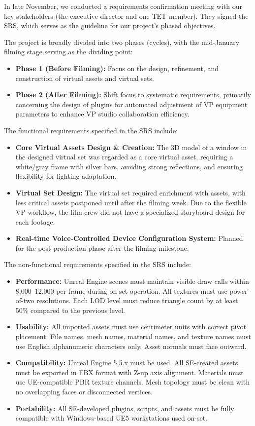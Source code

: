 \documentclass[12pt,a4paper]{report}
\begin{document}
In late November, we conducted a requirements confirmation meeting with our key stakeholders (the executive director and one TET member). They signed the SRS, which serves as the guideline for our project's phased objectives.

The project is broadly divided into two phases (cycles), with the mid-January filming stage serving as the dividing point:
\begin{itemize}
    \item \textbf{Phase 1 (Before Filming):} Focus on the design, refinement, and construction of virtual assets and virtual sets.
    \item \textbf{Phase 2 (After Filming):} Shift focus to systematic requirements, primarily concerning the design of plugins for automated adjustment of VP equipment parameters to enhance VP studio collaboration efficiency.
\end{itemize}

The functional requirements specified in the SRS include:
\begin{itemize}
    \item \textbf{Core Virtual Assets Design \& Creation:} The 3D model of a window in the designed virtual set was regarded as a core virtual asset, requiring a white/gray frame with silver bars, avoiding strong reflections, and ensuring flexibility for lighting adaptation.
    \item \textbf{Virtual Set Design:} The virtual set required enrichment with assets, with less critical assets postponed until after the filming week. Due to the flexible VP workflow, the film crew did not have a specialized storyboard design for each footage.
    \item \textbf{Real-time Voice-Controlled Device Configuration System:} Planned for the post-production phase after the filming milestone.
\end{itemize}

The non-functional requirements specified in the SRS include:
\begin{itemize}
    \item \textbf{Performance:} Unreal Engine scenes must maintain visible draw calls within 8,000–12,000 per frame during on-set operation. All textures must use power-of-two resolutions. Each LOD level must reduce triangle count by at least 50\% compared to the previous level.
    \item \textbf{Usability:} All imported assets must use centimeter units with correct pivot placement. File names, mesh names, material names, and texture names must use English alphanumeric characters only. Asset normals must face outward.
    \item \textbf{Compatibility:} Unreal Engine 5.5.x must be used. All SE-created assets must be exported in FBX format with Z-up axis alignment. Materials must use UE-compatible PBR texture channels. Mesh topology must be clean with no overlapping faces or disconnected vertices.
    \item \textbf{Portability:} All SE-developed plugins, scripts, and assets must be fully compatible with Windows-based UE5 workstations used on-set.
\end{itemize}
\end{document}
